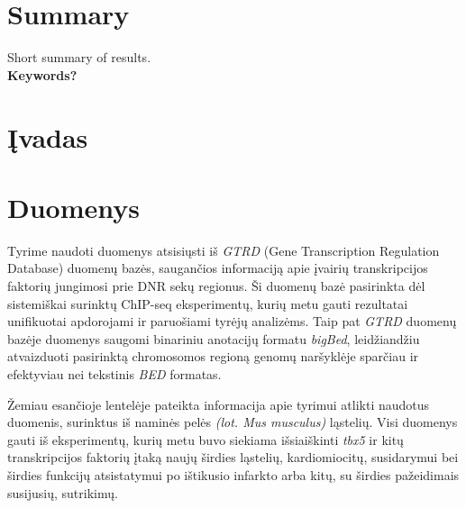 \documentclass[11pt]{article}
\begin{document}
\section*{Summary}
Short summary of results.\\

\textbf{Keywords?}
\newpage

\section{Įvadas}
\newpage

\section{Duomenys}

Tyrime naudoti duomenys atsisiųsti iš \emph{GTRD} (Gene Transcription
Regulation Database) duomenų bazės, saugančios informaciją apie įvairių
transkripcijos faktorių jungimosi prie DNR sekų regionus. Ši duomenų
bazė pasirinkta dėl sistemiškai surinktų ChIP-seq eksperimentų, kurių
metu gauti rezultatai unifikuotai apdorojami ir paruošiami tyrėjų
analizėms. Taip pat \emph{GTRD} duomenų bazėje duomenys saugomi
binariniu anotacijų formatu \emph{bigBed}, leidžiandžiu atvaizduoti
pasirinktą chromosomos regioną genomų naršyklėje sparčiau ir 
efektyviau nei tekstinis \emph{BED} formatas.

Žemiau esančioje lentelėje pateikta informacija apie tyrimui atlikti
naudotus duomenis, surinktus iš naminės pelės \emph{(lot. Mus musculus)}
ląstelių. Visi duomenys gauti iš eksperimentų, kurių metu buvo
siekiama išsiaiškinti \emph{tbx5} ir kitų transkripcijos faktorių
įtaką naujų širdies ląstelių, kardiomiocitų, susidarymui bei širdies
funkcijų atsistatymui po ištikusio infarkto arba kitų, su širdies
pažeidimais susijusių, sutrikimų.
\end{document}
